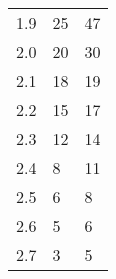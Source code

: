 \begin{table}[H]
{\begin{tabular}{|l|l|l|}
1.9                      & 25                                                                                                                  & 47                                                                                                                 \\
2.0                      & 20                                                                                                                  & 30                                                                                                                 \\
2.1                      & 18                                                                                                                  & 19                                                                                                                 \\
2.2                      & 15                                                                                                                  & 17                                                                                                                 \\
2.3                      & 12                                                                                                                  & 14                                                                                                                 \\
2.4                      & 8                                                                                                                   & 11                                                                                                                 \\
2.5                      & 6                                                                                                                   & 8                                                                                                                  \\
2.6                      & 5                                                                                                                   & 6                                                                                                                  \\
2.7                      & 3                                                                                                                   & 5                                                                                                                  \\

\end{tabular}}
\end{table}
